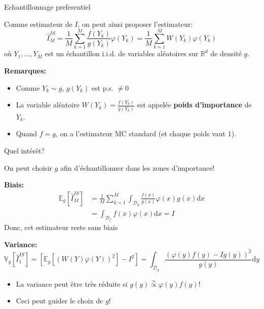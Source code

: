 \documentclass[ignorenonframetext,]{beamer}
\providecommand{\tightlist}{%
  \setlength{\itemsep}{0pt}\setlength{\parskip}{0pt}}
\newcommand{\rmd}{\text{d}}
\newcommand{\R}{\mathbb{R}}
\newcommand{\E}{\mathbb{E}}
\newcommand{\V}{\mathbb{V}}
\begin{document}
\begin{frame}{Echantillonnage preferentiel}
\protect\hypertarget{echantillonnage-preferentiel}{}

Comme estimateur de \(I\), on peut ainsi proposer l'estimateur:
\[\hat{I}^{IS}_M = \frac{1}{M}\sum_{k = 1}^M \frac{f(Y_k)}{g(Y_k)} \varphi(Y_k)  = \frac{1}{M}\sum_{k = 1}^M W(Y_k)\varphi(Y_k)\]
où \(Y_1,\dots,Y_M\) est un échantillon i.i.d. de variables aléatoires
sur \(\R^d\) de densité \(g\).\pause

\textbf{Remarques:}

\begin{itemize}
\tightlist
\item
  Comme \(Y_k \sim g\), \(g(Y_k)\) est p.s. \(\neq 0\)\pause
\item
  La variable aléatoire \(W(Y_k) = \frac{f(Y_k)}{g(Y_k)}\) est appelée
  \textbf{poids d'importance} de \(Y_k\). \pause
\item
  Quand \(f = g\), on a l'estimateur MC standard (et chaque poids vaut
  1).
\end{itemize}

\end{frame}

\begin{frame}{Quel intérêt?}
\protect\hypertarget{quel-intuxe9ruxeat}{}

On peut choisir \(g\) afin d'échantillonner dans les zones d'importance!

\textbf{Biais:} \begin{align*}
\E_g[\hat{I}^{IS}_M]&=\frac{1}{M}\sum_{k=1}^M\int_{\mathcal{D}_g}  \frac{f(x)}{g(x)}\varphi(x) g(x) \rmd x\\
&=\int_{\mathcal{D}_f}  f(x)\varphi(x) \rmd x = I
\end{align*} Donc, cet estimateur reste sans biais\pause

\textbf{Variance:}
\[\V_g[\hat{I}^{IS}_1] = \left[\E_g[\left(W(Y)\varphi(Y)\right)^2]  - I^2\right] = \int_{\mathcal{D}_g}\frac{\left(\varphi(y)f(y) - Ig(y)\right)^2}{g(y)}\rmd y\]

\begin{itemize}
\tightlist
\item
  La variance peut être très réduite si
  \(g(y) \overset{\approx}{\propto} \varphi(y)f(y)\)!
\item
  Ceci peut guider le choix de \(g\)!
\end{itemize}

\end{frame}
\end{document}
